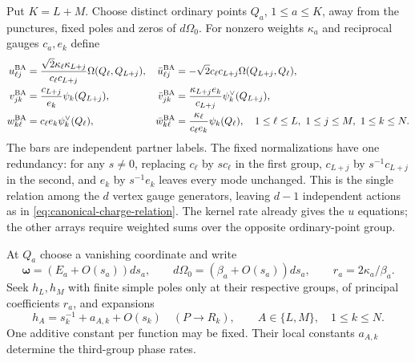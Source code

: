 Put $K=L+M$. Choose distinct ordinary points $Q_a$, $1\leq a\leq K$,
away from the punctures, fixed poles and zeros of $d\Omega_0$.
For nonzero weights $\kappa_a$ and reciprocal gauges $c_a,e_k$ define
\begin{equation}\label{eq:multipoint-mode-arrays}
\begin{aligned}
 u_{\ell j}^{\rm BA}&=\frac{\sqrt2\kappa_{\ell}\kappa_{L+j}}{c_{\ell}c_{L+j}}
                  \Omega(Q_{\ell},Q_{L+j}),&
 \bar u_{\ell j}^{\rm BA}&=-\sqrt2c_{\ell}c_{L+j}\Omega(Q_{L+j},Q_{\ell}),\\
 v_{jk}^{\rm BA}&=\frac{c_{L+j}}{e_k}\psi_k(Q_{L+j}),&
 \bar v_{jk}^{\rm BA}&=\frac{\kappa_{L+j}e_k}{c_{L+j}}\psi_k^\vee(Q_{L+j}),\\
 w_{k\ell}^{\rm BA}&=c_{\ell}e_k\psi_k^\vee(Q_{\ell}),&
 \bar w_{k\ell}^{\rm BA}&=\frac{\kappa_{\ell}}{c_{\ell}e_k}\psi_k(Q_{\ell}),
 \quad1\leq\ell\leq L,\ 1\leq j\leq M,\ 1\leq k\leq N.
\end{aligned}
\end{equation}
The bars are independent partner labels. The fixed normalizations have
one redundancy: for any $s\ne0$, replacing $c_{\ell}$ by $sc_{\ell}$ in the
first group, $c_{L+j}$ by $s^{-1}c_{L+j}$ in the second, and $e_k$
by $s^{-1}e_k$ leaves every mode unchanged. This is the single
relation among the $d$ vertex gauge generators, leaving $d-1$
independent actions as in \cref{eq:canonical-charge-relation}.
The kernel rate already gives
the $u$ equations; the other arrays require weighted sums over the
opposite ordinary-point group.

At $Q_a$ choose a vanishing coordinate and write
\begin{equation}\label{eq:general-residue-data}
 \boldsymbol\omega=(E_a+O(s_a))ds_a,\qquad
 d\Omega_0=(\beta_a+O(s_a))ds_a,\qquad r_a=2\kappa_a/\beta_a.
\end{equation}
Seek $h_L,h_M$ with finite simple poles only at their respective
groups, of principal coefficients $r_a$, and expansions
\begin{equation}\label{eq:general-h-normalization}
 h_A=s_k^{-1}+a_{A,k}+O(s_k)\quad(P\to R_k),
 \qquad A\in\{L,M\},\quad1\leq k\leq N.
\end{equation}
One additive constant per function may be fixed. Their local constants
$a_{A,k}$ determine the third-group phase rates.

